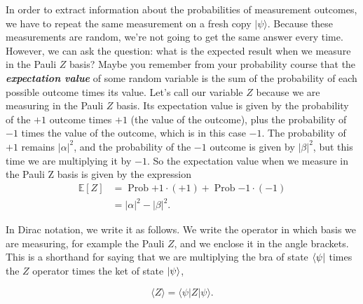 In order to extract information about the probabilities of measurement outcomes, we have to repeat the same measurement on a fresh copy $|\psi\rangle$. Because these measurements are random, we're not going to get the same answer every time. However, we can ask the question: what is the expected result when we measure in the Pauli $Z$ basis? Maybe you remember from your probability course that the \textbf{\emph{expectation value}} of some random variable is the sum of the probability of each possible outcome times its value. Let's call our variable $Z$ because we are measuring in the Pauli $Z$ basis.  Its expectation value is given by the probability of the $+1$ outcome times $+1$ (the value of the outcome), plus the probability of $-1$ times the value of the outcome, which is in this case $-1$.  The probability of $+1$ remains $|\alpha|^2$, and the probability of the $-1$ outcome is given by $|\beta|^2$, but this time we are multiplying it by $-1$. So the expectation value when we measure in the Pauli Z basis is given by the expression
\begin{equation}
\begin{aligned}
    \mathbb{E}[Z] &=\operatorname{Prob}{+1} \cdot(+1)+\operatorname{Prob}{-1} \cdot(-1) \\
    &=|\alpha|^{2}-|\beta|^{2}.
    \label{eq:expectation_Z}
\end{aligned}
\end{equation}

In Dirac notation, we write it as follows. We write the operator in which basis we are measuring, for example the Pauli $Z$, and we enclose it in the angle brackets. This is a shorthand for saying that we are multiplying the bra of state $\left\langle \psi \right|$ times the $Z$ operator times the ket of state $\left| \psi \right\rangle$,

\begin{equation}
    \langle Z\rangle=\langle\psi|Z| \psi\rangle.
\end{equation}

